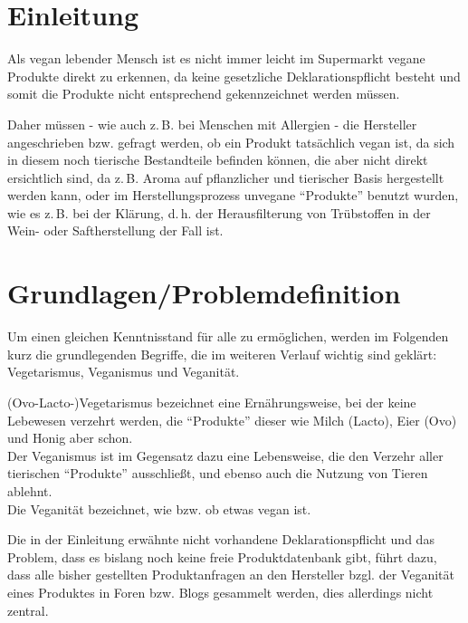 \documentclass[a4paper,11pt,bibtotoc,headsepline]{scrartcl}
\title{\namefull}
\author{Yannic Haupenthal (2522096)}
\date{\today{}}
\begin{document}
\maketitle

\pagestyle{plain}

\section{Einleitung}

Als vegan lebender Mensch ist es nicht immer leicht im Supermarkt
vegane Produkte direkt zu erkennen, da keine gesetzliche
Deklarationspflicht besteht und somit die Produkte nicht
entsprechend gekennzeichnet werden müssen.

Daher müssen - wie auch z.\,B. bei Menschen mit Allergien - die Hersteller
angeschrieben bzw. gefragt werden, ob ein Produkt tatsächlich vegan
ist, da sich in diesem noch tierische Bestandteile befinden können,
die aber nicht direkt ersichtlich sind, da z.\,B. Aroma auf
pflanzlicher und tierischer Basis hergestellt werden kann, oder im
Herstellungsprozess unvegane ``Produkte'' benutzt wurden, wie es
z.\,B. bei der Klärung, d.\,h. der Herausfilterung von Trübstoffen in
der Wein- oder Saftherstellung der Fall ist.

\section{Grundlagen/Problemdefinition} %

Um einen gleichen Kenntnisstand für alle zu ermöglichen, werden im
Folgenden kurz die grundlegenden Begriffe, die im weiteren Verlauf wichtig sind
geklärt: Vegetarismus, Veganismus und Veganität.

(Ovo-Lacto-)Vegetarismus bezeichnet eine Ernährungsweise, bei der keine
Lebewesen verzehrt werden, die ``Produkte'' dieser wie Milch (Lacto),
Eier (Ovo) und Honig aber schon.\\
Der Veganismus ist im Gegensatz dazu eine Lebensweise, die den Verzehr
aller tierischen ``Produkte'' ausschließt, und ebenso auch die Nutzung
von Tieren ablehnt.\\
Die Veganität bezeichnet, wie bzw. ob etwas vegan ist.

Die in der Einleitung erwähnte nicht vorhandene Deklarationspflicht
und das Problem, dass es bislang noch keine freie Produktdatenbank
gibt, führt dazu, dass alle bisher gestellten Produktanfragen an den
Hersteller bzgl. der Veganität eines Produktes in Foren bzw. Blogs
gesammelt werden, dies allerdings nicht zentral.
\end{document}
